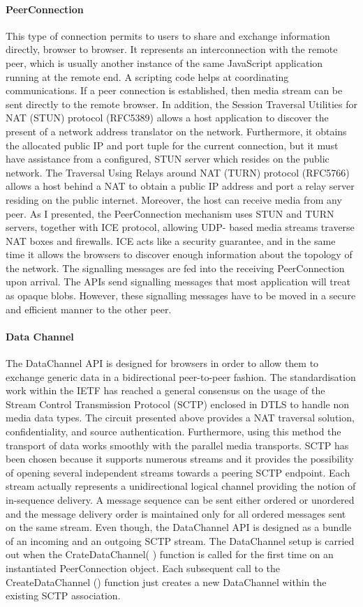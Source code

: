 \paragraph{PeerConnection}
This type of connection permits to users to share and exchange information directly, browser to browser.
It represents an interconnection with the remote peer, which is usually another instance of the same JavaScript
application running at the remote end. A scripting code helps at coordinating communications. If a peer connection
is established, then media stream can be sent directly to the remote browser. 
In addition, the Session Traversal Utilities for NAT (STUN) protocol (RFC5389) allows a host application to
discover the present of a network address translator on the network. Furthermore, it obtains the allocated
public IP and port tuple for the current connection, but it must have assistance from a configured, STUN server
which resides on the public network. The Traversal Using Relays around NAT (TURN) protocol (RFC5766) allows a host
behind a NAT to obtain a public IP address and port a relay server residing on the public internet. Moreover,
the host can receive media from any peer. 
As I presented, the PeerConnection mechanism uses STUN and TURN servers, together with ICE protocol, 
allowing UDP- based media streams traverse NAT boxes and firewalls. ICE acts like a security guarantee,
and in the same time it allows the browsers to discover enough information about the topology of the network. 
The signalling messages are fed into the receiving PeerConnection upon arrival. The APIs send signalling messages 
that most application will treat as opaque blobs. However, these signalling messages have to be moved in a 
secure and efficient manner to the other peer. 


\paragraph{Data Channel}
The DataChannel API is designed for browsers in order to allow them to exchange generic data in a bidirectional 
peer-to-peer fashion. The standardisation work within the IETF has reached a general consensus on the usage of the
Stream Control Transmission Protocol (SCTP) enclosed in DTLS to handle non media data types. The circuit presented
above provides a NAT traversal solution, confidentiality, and source authentication. Furthermore, using this method
the transport of data works smoothly with the parallel media transports. SCTP has been chosen because it supports 
numerous streams and it provides the possibility of opening several independent streams towards a peering SCTP endpoint.
Each stream actually represents a unidirectional logical channel providing the notion of in-sequence delivery. A message
sequence can be sent either ordered or unordered and the message delivery  order is maintained only for all ordered messages 
sent on the same stream. Even though, the DataChannel API is designed as a bundle of an incoming and an outgoing SCTP stream.
The DataChannel setup is carried out when the CrateDataChannel( ) function is called for the first time on an instantiated
PeerConnection object. Each subsequent call to the CreateDataChannel () function just creates a new DataChannel within the
existing SCTP association.

